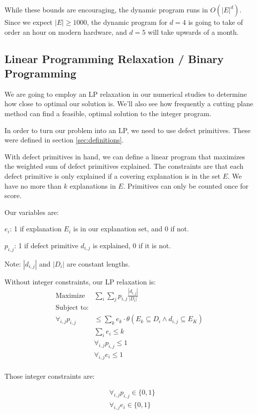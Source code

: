 While these bounds are encouraging, the dynamic program runs in $O(|E|^{d})$.  Since we expect $|E| \geq 1000$, the dynamic program for $d=4$ is going to take of order an hour on modern hardware, and $d=5$ will take upwards of a month.

\subsection{Linear Programming Relaxation / Binary Programming} \label{sec:IP}

We are going to employ an LP relaxation in our numerical studies to determine how close to optimal our solution is.  We'll also see how frequently a cutting plane method can find a feasible, optimal solution to the integer program.

In order to turn our problem into an LP, we need to use defect primitives.  These were defined in section \ref{sec:definitions}.

With defect primitives in hand, we can define a linear program that maximizes the weighted sum of defect primitives explained.  The constraints are that each defect primitive is only explained if a covering explanation is in the set {\bf $E$}.  We have no more than $k$ explanations in {\bf $E$}.  Primitives can only be counted once for score.

Our variables are: 

$e_i$: 1 if explanation $E_i$ is in our explanation set, and 0 if not.

$p_{i,j}$: 1 if defect primitive $d_{i,j}$ is explained, 0 if it is not.

Note: $|d_{i,j}|$ and $|D_i|$ are constant lengths.

Without integer constraints, our LP relaxation is:
\begin{eqnarray*}
  \textrm{Maximize} &\sum_i \sum_j p_{i,j} \frac{|d_{i,j}|}{|D_i|} \\
  \textrm{Subject to:} &\\
  \forall_{i,j} p_{i,j} &\leq \sum_k e_k \cdot \theta(E_k \subseteq D_i \wedge d_{i,j} \subseteq E_K ) \\
  &\sum_i e_i \leq k \\
  &\forall_{i,j} p_{i,j} \leq 1 \\
  &\forall_{i,j} e_i \leq 1 \\
\end{eqnarray*}

Those integer constraints are:

\begin{eqnarray*}
  &\forall_{i,j} p_{i,j} \in \{0,1\} \\
  &\forall_{i,j} e_i  \in \{0,1\} \\
\end{eqnarray*}

